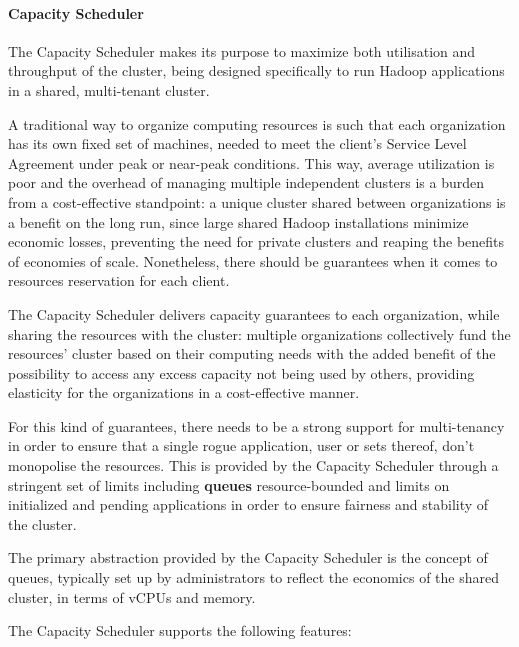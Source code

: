 \paragraph{Capacity Scheduler}

The Capacity Scheduler makes its purpose to maximize both utilisation and throughput of the cluster, being designed specifically to run Hadoop applications in a shared, multi-tenant cluster.

A traditional way to organize computing resources is such that each organization has its own fixed set of machines, needed to meet the client’s Service Level Agreement under peak or near-peak conditions. This way, average utilization is poor and the overhead of managing multiple independent clusters is a burden from a cost-effective standpoint: a unique cluster shared between organizations is a benefit on the long run, since large shared Hadoop installations minimize economic losses, preventing the need for private clusters and reaping the benefits of economies of scale. Nonetheless, there should be guarantees when it comes to resources reservation for each client.

The Capacity Scheduler delivers capacity guarantees to each organization, while sharing the resources with the cluster: multiple organizations collectively fund the resources' cluster based on their computing needs with the added benefit of the possibility to access any excess capacity not being used by others, providing elasticity for the organizations in a cost-effective manner.

For this kind of guarantees, there needs to be a strong support for multi-tenancy in order to ensure that a single rogue application, user or sets thereof, don't monopolise the resources. This is provided by the Capacity Scheduler through a stringent set of limits including \textbf{queues} resource-bounded and limits on initialized and pending applications in order to ensure fairness and stability of the cluster.

The primary abstraction provided by the Capacity Scheduler is the concept of queues, typically set up by administrators to reflect the economics of the shared cluster, in terms of vCPUs and memory.

The Capacity Scheduler supports the following features:

